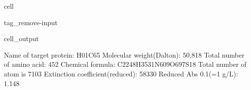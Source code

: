 \documentclass[letterpaper,10pt,english]{jupyterBook}
\begin{document}
\begin{sphinxuseclass}{cell}
\begin{sphinxuseclass}{tag_remove-input}\begin{sphinxVerbatimOutput}

\begin{sphinxuseclass}{cell_output}
\begin{sphinxVerbatim}[commandchars=\\\{\}]
\PYGZsh{} Name of target protein: \PYGZhy{}\PYGZhy{}\PYGZhy{}\PYGZhy{}\PYGZhy{}\PYGZhy{}\PYGZhy{}\PYGZhy{}\PYGZhy{}\PYGZhy{}\PYGZhy{}\PYGZhy{}\PYGZhy{}\PYGZhy{}\PYGZhy{}\PYGZhy{}\PYGZhy{}\PYGZhy{}\PYGZhy{}\PYGZhy{}\PYGZhy{}\PYGZhy{}\PYGZhy{}\PYGZhy{}\PYGZhy{}\PYGZhy{}\PYGZhy{}\PYGZhy{}\PYGZhy{}\PYGZhy{}\PYGZhy{}\PYGZhy{}\PYGZhy{}H\PYGZus{}01C65
\PYGZsh{} Molecular weight(Dalton): \PYGZhy{}\PYGZhy{}\PYGZhy{}\PYGZhy{}\PYGZhy{}\PYGZhy{}\PYGZhy{}\PYGZhy{}\PYGZhy{}\PYGZhy{}\PYGZhy{}\PYGZhy{}\PYGZhy{}\PYGZhy{}\PYGZhy{}\PYGZhy{}\PYGZhy{}\PYGZhy{}\PYGZhy{}\PYGZhy{}\PYGZhy{}\PYGZhy{}\PYGZhy{}\PYGZhy{}\PYGZhy{}\PYGZhy{}\PYGZhy{}\PYGZhy{}\PYGZhy{}\PYGZhy{}\PYGZhy{}\PYGZhy{}50,818
\PYGZsh{} Total number of amino acid: \PYGZhy{}\PYGZhy{}\PYGZhy{}\PYGZhy{}\PYGZhy{}\PYGZhy{}\PYGZhy{}\PYGZhy{}\PYGZhy{}\PYGZhy{}\PYGZhy{}\PYGZhy{}\PYGZhy{}\PYGZhy{}\PYGZhy{}\PYGZhy{}\PYGZhy{}\PYGZhy{}\PYGZhy{}\PYGZhy{}\PYGZhy{}\PYGZhy{}\PYGZhy{}\PYGZhy{}\PYGZhy{}\PYGZhy{}\PYGZhy{}\PYGZhy{}\PYGZhy{}\PYGZhy{}\PYGZhy{}\PYGZhy{}\PYGZhy{}452
\PYGZsh{} Chemical formula: \PYGZhy{}\PYGZhy{}\PYGZhy{}\PYGZhy{}\PYGZhy{}\PYGZhy{}\PYGZhy{}\PYGZhy{}\PYGZhy{}\PYGZhy{}\PYGZhy{}\PYGZhy{}\PYGZhy{}\PYGZhy{}\PYGZhy{}\PYGZhy{}\PYGZhy{}\PYGZhy{}\PYGZhy{}\PYGZhy{}\PYGZhy{}\PYGZhy{}\PYGZhy{}\PYGZhy{}\PYGZhy{}C2248H3531N609O697S18
\PYGZsh{} Total number of atom is \PYGZhy{}\PYGZhy{}\PYGZhy{}\PYGZhy{}\PYGZhy{}\PYGZhy{}\PYGZhy{}\PYGZhy{}\PYGZhy{}\PYGZhy{}\PYGZhy{}\PYGZhy{}\PYGZhy{}\PYGZhy{}\PYGZhy{}\PYGZhy{}\PYGZhy{}\PYGZhy{}\PYGZhy{}\PYGZhy{}\PYGZhy{}\PYGZhy{}\PYGZhy{}\PYGZhy{}\PYGZhy{}\PYGZhy{}\PYGZhy{}\PYGZhy{}\PYGZhy{}\PYGZhy{}\PYGZhy{}\PYGZhy{}\PYGZhy{}\PYGZhy{}\PYGZhy{}\PYGZhy{}7103
\PYGZsh{} Extinction coefficient(reduced): \PYGZhy{}\PYGZhy{}\PYGZhy{}\PYGZhy{}\PYGZhy{}\PYGZhy{}\PYGZhy{}\PYGZhy{}\PYGZhy{}\PYGZhy{}\PYGZhy{}\PYGZhy{}\PYGZhy{}\PYGZhy{}\PYGZhy{}\PYGZhy{}\PYGZhy{}\PYGZhy{}\PYGZhy{}\PYGZhy{}\PYGZhy{}\PYGZhy{}\PYGZhy{}\PYGZhy{}\PYGZhy{}\PYGZhy{}58330
\PYGZsh{} Reduced Abs 0.1\PYGZpc{}(=1 g/L): \PYGZhy{}\PYGZhy{}\PYGZhy{}\PYGZhy{}\PYGZhy{}\PYGZhy{}\PYGZhy{}\PYGZhy{}\PYGZhy{}\PYGZhy{}\PYGZhy{}\PYGZhy{}\PYGZhy{}\PYGZhy{}\PYGZhy{}\PYGZhy{}\PYGZhy{}\PYGZhy{}\PYGZhy{}\PYGZhy{}\PYGZhy{}\PYGZhy{}\PYGZhy{}\PYGZhy{}\PYGZhy{}\PYGZhy{}\PYGZhy{}\PYGZhy{}\PYGZhy{}\PYGZhy{}\PYGZhy{}\PYGZhy{}\PYGZhy{}1.148

\end{sphinxVerbatim}
\end{sphinxuseclass}
\end{sphinxVerbatimOutput}
\end{sphinxuseclass}
\end{sphinxuseclass}
\end{document}
